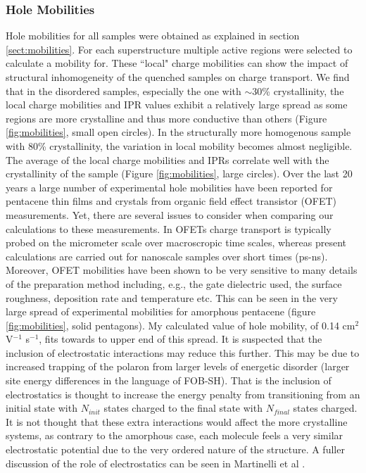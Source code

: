 \subsubsection{Hole Mobilities}
Hole mobilities for all samples were obtained as explained in section \ref{sect:mobilities}. For each superstructure multiple active regions were selected to calculate a mobility for. These ``local" charge mobilities can show the impact of structural inhomogeneity of the quenched samples on charge transport. We find that in the disordered samples, especially the one with $\sim$30\% crystallinity, the local charge mobilities and IPR values exhibit a relatively large spread as some regions are more crystalline and thus more conductive than others (Figure \ref{fig:mobilities}, small open circles). In the structurally more homogenous sample with 80\% crystallinity, the variation in local mobility becomes almost negligible. The average of the local charge mobilities and IPRs correlate well with the crystallinity of the sample (Figure \ref{fig:mobilities}, large circles). Over the last 20 years a large number of experimental hole mobilities have been reported for pentacene thin films and crystals from organic field effect transistor (OFET) measurements. Yet, there are several issues to consider when comparing our calculations to these measurements. In OFETs charge transport is typically probed on the micrometer scale over macroscropic time scales, whereas present calculations are carried out for nanoscale samples over short times (ps-ns). Moreover, OFET mobilities have been shown to be very sensitive to many details of the preparation method including, e.g., the gate dielectric used, the surface roughness, deposition rate and temperature etc. This can be seen in the very large spread of experimental mobilities  for amorphous pentacene (figure \ref{fig:mobilities}, solid pentagons). My calculated value of hole mobility, of 0.14 cm$^2$ V$^{-1}$ s$^{-1}$, fits towards to upper end of this spread. It is suspected that the inclusion of electrostatic interactions may reduce this further. This may be due to increased trapping of the polaron from larger levels of energetic disorder (larger site energy differences in the language of FOB-SH). That is the inclusion of electrostatics is thought to increase the energy penalty from transitioning from an initial state with $N_{init}$ states charged to the final state with $N_{final}$ states charged. It is not thought that these extra interactions would affect the more crystalline systems, as contrary to the amorphous case, each molecule feels a very similar electrostatic potential due to the very ordered nature of the structure. A fuller discussion of the role of electrostatics can be seen in Martinelli et al \cite{ESEffectOnMob}.
